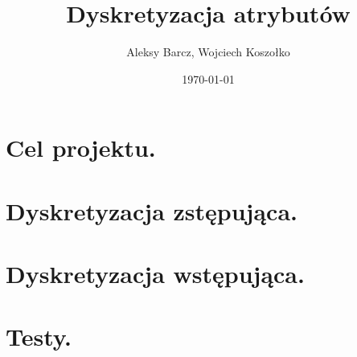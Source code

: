 \documentclass[11pt,a4paper]{report}
\date {\today}
\author {Aleksy Barcz, Wojciech Koszołko}
\title{Dyskretyzacja atrybutów}
\begin{document}
\maketitle
\tableofcontents



\chapter{Cel projektu.}


\chapter{Dyskretyzacja zstępująca.}


\chapter{Dyskretyzacja wstępująca.}


\chapter{Testy.}


\nocite{*}

\end{document}
